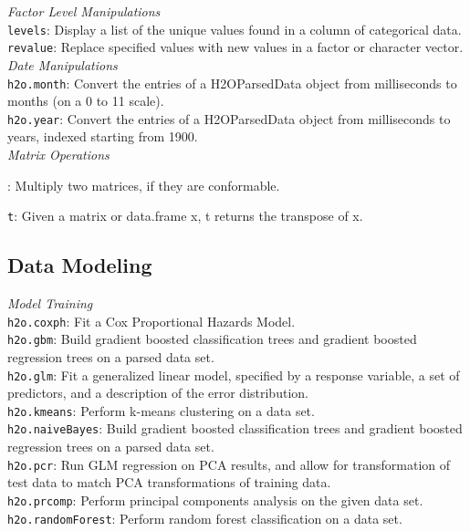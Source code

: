 \documentclass[11pt]{article}
\begin{document}
\begin{enumerate}
{{\textit{Factor Level Manipulations}\\

{\texttt{levels}}: Display a list of the unique values found in a column of categorical data. \\
{\texttt{revalue}}: Replace specified values with new values in a factor or character vector.\\

\textit{Date Manipulations}\\

{\texttt{h2o.month}}: Convert the entries of a H2OParsedData object from milliseconds to months (on a 0 to 11 scale). \\
{\texttt{h2o.year}}: Convert the entries of a H2OParsedData object from milliseconds to years, indexed starting from 1900.\\

\textit{Matrix Operations}

{\textttt{\%$*$\%}}}: Multiply two matrices, if they are conformable.

{\texttt{t}}: Given a matrix or data.frame x, t returns the transpose of x.\\

\subsection{Data Modeling}

\textit{Model Training}\\

{\texttt{h2o.coxph}}: Fit a Cox Proportional Hazards Model. \\
{\texttt{h2o.gbm}}: Build gradient boosted classification trees and gradient boosted regression trees on a parsed data set. \\
{\texttt{h2o.glm}}: Fit a generalized linear model, specified by a response variable, a set of predictors, and a description of the error distribution. \\
{\texttt{h2o.kmeans}}: Perform k-means clustering on a data set. \\
{\texttt{h2o.naiveBayes}}: Build gradient boosted classification trees and gradient boosted regression trees on a parsed data set.\\
{\texttt{h2o.pcr}}: Run GLM regression on PCA results, and allow for transformation of test data to match PCA transformations of training data. \\
{\texttt{h2o.prcomp}}: Perform principal components analysis on the given data set. \\
{\texttt{h2o.randomForest}}: Perform random forest classification on a data set.\\

}
\end{enumerate}
\end{document}
